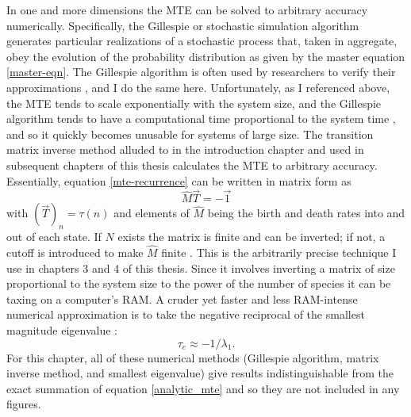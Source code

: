 In one and more dimensions the MTE can be solved to arbitrary accuracy numerically. %
Specifically, the Gillespie or stochastic simulation algorithm \cite{Gillespie1977,Cao2006} generates particular realizations of a stochastic process that, taken in aggregate, obey the evolution of the probability distribution as given by the master equation \ref{master-eqn}. %
The Gillespie algorithm is often used by researchers to verify their approximations \cite{Reichenbach2006,Black2012,Dobrinevski2012,Chotibut2015,Constable2015,Gooding-townsend2015,Young2018}, and I do the same here. %
Unfortunately, as I referenced above, the MTE tends to scale exponentially with the system size, and the Gillespie algorithm tends to have a computational time proportional to the system time \cite{Gillespie1977}, and so it quickly becomes unusable for systems of large size. %
The transition matrix inverse method alluded to in the introduction chapter and used in subsequent chapters of this thesis calculates the MTE to arbitrary accuracy. 
Essentially, equation \ref{mte-recurrence} can be written in matrix form as \cite{Nisbet1982,Iyer-Biswas2015}
\begin{equation}
\hat{M}\vec{T} = -\vec{1}
 \label{matrix-method}
\end{equation}
with $\left(\vec{T}\right)_n = \tau(n)$ and elements of $\hat{M}$ being the birth and death rates into and out of each state. 
If $N$ exists the matrix is finite and can be inverted; if not, a cutoff is introduced to make $\hat{M}$ finite \cite{Munsky2006,Parsons2007,Parsons2010}. 
This is the arbitrarily precise technique I use in chapters 3 and 4 of this thesis. 
Since it involves inverting a matrix of size proportional to the system size to the power of the number of species it can be taxing on a computer's RAM. 
A cruder yet faster and less RAM-intense numerical approximation is to take the negative reciprocal of the smallest magnitude eigenvalue \cite{Hanggi1990}:
\begin{equation}
 \tau_e \approx -1/\lambda_1. 
\end{equation}
For this chapter, all of these numerical methods (Gillespie algorithm, matrix inverse method, and smallest eigenvalue) give results indistinguishable from the exact summation of equation \ref{analytic_mte} and so they are not included in any figures. 

